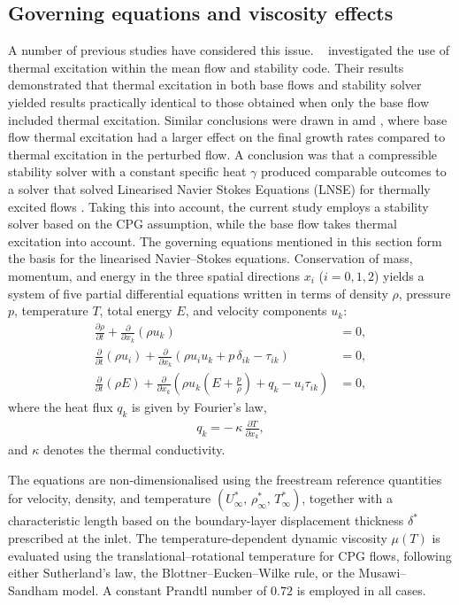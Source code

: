 \subsection{Governing equations and viscosity effects}
A number of previous studies have considered this issue. ~\cite{Wartemann2019} investigated the use of thermal excitation within the mean flow and stability code. Their results demonstrated that thermal excitation in both base flows and stability solver yielded results practically identical to those obtained when only the base flow included thermal excitation. Similar conclusions were drawn in \cite{MortensenZhong2013} amd \cite{miromiroThesis}, where base flow thermal excitation had a larger effect on the final growth rates compared to thermal excitation in the perturbed flow. A conclusion was that a compressible stability solver with a constant specific heat $\gamma$ produced comparable outcomes to a solver that solved Linearised Navier Stokes Equations (LNSE) for thermally excited flows \cite{Wartemann2019}. Taking this into account, the current study employs a stability solver based on the \gls{CPG} assumption, while the base flow takes thermal excitation into account. The governing equations mentioned in this section form the basis for the linearised Navier--Stokes equations. Conservation of mass, momentum, and energy in the three spatial directions \(x_i\) (\(i = 0, 1, 2\)) yields a system of five partial differential equations written in terms of density \(\rho\), pressure \(p\), temperature \(T\), total energy \(E\), and velocity components \(u_k\):
\begin{align}
\frac{\partial \rho}{\partial t}
+ \frac{\partial}{\partial x_k}\!\left(\rho u_k\right) &= 0, \\[0.5em]
\frac{\partial}{\partial t}\!\left(\rho u_i\right)
+ \frac{\partial}{\partial x_k}\!\left(\rho u_i u_k + p\,\delta_{ik} - \tau_{ik}\right) &= 0, \\[0.5em]
\frac{\partial}{\partial t}\!\left(\rho E\right)
+ \frac{\partial}{\partial x_k}\!\left(
  \rho u_k\!\left(E + \frac{p}{\rho}\right) + q_k - u_i \tau_{ik}
\right) &= 0,
\end{align}
where the heat flux \(q_k\) is given by Fourier’s law,
\begin{align}
q_k = -\,\kappa\,\frac{\partial T}{\partial x_k},
\end{align}
and \(\kappa\) denotes the thermal conductivity.

The equations are non-dimensionalised using the freestream reference quantities for velocity, density, and temperature \((U_\infty^*,\,\rho_\infty^*,\,T_\infty^*)\), together with a characteristic length based on the boundary-layer displacement thickness \(\delta^{*}\) prescribed at the inlet. The temperature-dependent dynamic viscosity \(\mu(T)\) is evaluated using the translational--rotational temperature for \gls{CPG} flows, following either Sutherland’s law, the Blottner--Eucken--Wilke rule, or the Musawi--Sandham model. A constant Prandtl number of \(0.72\) is employed in all cases. 





